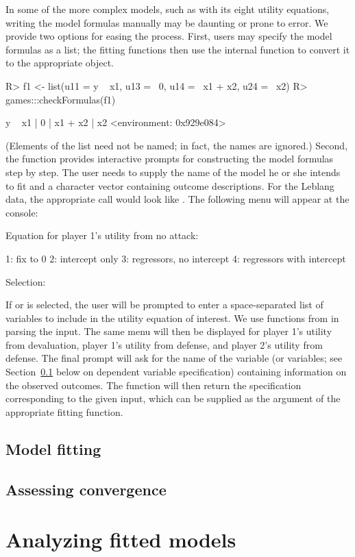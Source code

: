 \documentclass[article]{jss}
\begin{document}
In some of the more complex models, such as  with its eight
utility equations, writing the model formulas manually may be daunting or prone
to error.  We provide two options for easing the process.  First, users may
specify the model formulas as a list; the fitting functions then use the
internal function  to convert it to the appropriate
 object.
\begin{Schunk}
\begin{Sinput}
R> f1 <- list(u11 = y ~ x1, u13 = ~0, u14 = ~x1 + x2, u24 = ~x2)
R> games:::checkFormulas(f1)
\end{Sinput}
\begin{Soutput}
y ~ x1 | 0 | x1 + x2 | x2
<environment: 0x929e084>
\end{Soutput}
\end{Schunk}
(Elements of the list need not be named; in fact, the names are ignored.)
Second, the function  provides interactive prompts for
constructing the model formulas step by step.  The user needs to supply the name
of the model he or she intends to fit and a character vector containing outcome
descriptions.  For the Leblang data, the appropriate call would look like
.
The following menu will appear at the  console:
\begin{Code}
Equation for player 1's utility from no attack: 

1: fix to 0
2: intercept only
3: regressors, no intercept
4: regressors with intercept

Selection: 
\end{Code}
If  or  is selected, the user will be prompted to enter a
space-separated list of variables to include in the utility equation of
interest.  We use functions from  \citep{stringrpkg} in parsing the
input.  The same menu will then be displayed for player 1's utility from
devaluation, player 1's utility from defense, and player 2's utility from
defense.  The final prompt will ask for the name of the variable (or variables;
see Section~\ref{sec:fitting} below on dependent variable specification)
containing information on the observed outcomes.  The function will then return
the  specification corresponding to the given input, which can be
supplied as the  argument of the appropriate fitting function.

\subsection{Model fitting}
\label{sec:fitting}


\subsection{Assessing convergence}


\section{Analyzing fitted models}


\end{document}
